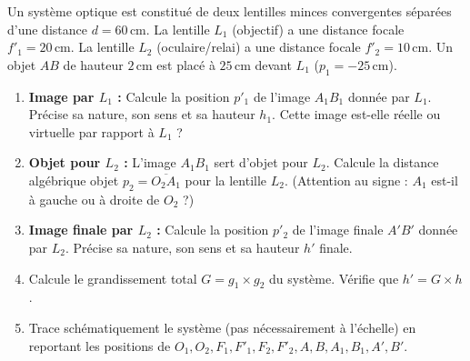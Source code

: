 \documentclass[11pt]{article}
\begin{document}
\begin{exercice}
Un système optique est constitué de deux lentilles minces convergentes séparées d'une distance $d = 60\,\text{cm}$.
La lentille $L_1$ (objectif) a une distance focale $f'_1 = 20\,\text{cm}$.
La lentille $L_2$ (oculaire/relai) a une distance focale $f'_2 = 10\,\text{cm}$.
Un objet $AB$ de hauteur $2\,\text{cm}$ est placé à $25\,\text{cm}$ devant $L_1$ ($p_1 = -25\,\text{cm}$).
\begin{enumerate}
    \item \textbf{Image par $L_1$ :} Calcule la position $p'_1$ de l'image $A_1B_1$ donnée par $L_1$. Précise sa nature, son sens et sa hauteur $h_1$. Cette image est-elle réelle ou virtuelle par rapport à $L_1$ ?
    \item \textbf{Objet pour $L_2$ :} L'image $A_1B_1$ sert d'objet pour $L_2$. Calcule la distance algébrique objet $p_2 = \overline{O_2A_1}$ pour la lentille $L_2$. (Attention au signe : $A_1$ est-il à gauche ou à droite de $O_2$ ?)
    \item \textbf{Image finale par $L_2$ :} Calcule la position $p'_2$ de l'image finale $A'B'$ donnée par $L_2$. Précise sa nature, son sens et sa hauteur $h'$ finale.
    \item Calcule le grandissement total $G = g_1 \times g_2$ du système. Vérifie que $h' = G \times h$.
    \item Trace schématiquement le système (pas nécessairement à l'échelle) en reportant les positions de $O_1, O_2, F_1, F'_1, F_2, F'_2, A, B, A_1, B_1, A', B'$.
\end{enumerate}
\end{exercice}
\end{document}
